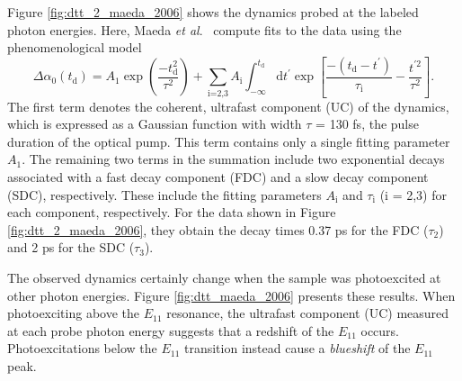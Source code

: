 Figure \ref{fig:dtt_2_maeda_2006} shows the dynamics probed at the labeled photon energies. Here, Maeda \textit{et al}.\ \cite{maeda2006gigantic} compute fits to the data using the phenomenological model
\begin{equation}
	\Delta \alpha_0(t_\text{d}) = A_1 \exp\left( \frac{-t_\text{d}^2}{\tau^2}\right) + \sum_\text{i=2,3} A_\text{i} \int^{t_\text{d}}_{-\infty} \mathrm{d} t^\prime \exp\left[ \frac{-(t_\text{d} - t^\prime)}{\tau_\text{i}} - \frac{t^{\prime 2}}{\tau^2}\right].
	\label{eq:fits_maeda_2006}
\end{equation}
The first term denotes the coherent, ultrafast component (UC) of the dynamics, which is expressed as a Gaussian function with width $\tau$ = 130 fs, the pulse duration of the optical pump. This term contains only a single fitting parameter $A_1$. The remaining two terms in the summation include two exponential decays associated with a fast decay component (FDC) and a slow decay component (SDC), respectively. These include the fitting parameters $A_\text{i}$ and $\tau_\text{i}$ (i = 2,3) for each component, respectively. For the data shown in Figure \ref{fig:dtt_2_maeda_2006}, they obtain the decay times 0.37 ps for the FDC ($\tau_2$) and 2 ps for the SDC ($\tau_3$).

The observed dynamics certainly change when the sample was photoexcited at other photon energies. Figure \ref{fig:dtt_maeda_2006} presents these results. When photoexciting above the $E_{11}$ resonance, the ultrafast component (UC) measured at each probe photon energy suggests that a redshift of the $E_{11}$ occurs. Photoexcitations below the $E_{11}$ transition instead cause a \textit{blueshift} of the $E_{11}$ peak.



